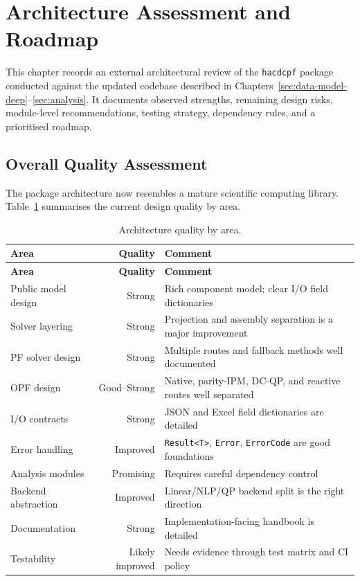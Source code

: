 \section{Architecture Assessment and Roadmap}
\label{sec:arch-assessment}

This chapter records an external architectural review of the
\texttt{hacdcpf} package conducted against the updated codebase described
in Chapters~\ref{sec:data-model-deep}--\ref{sec:analysis}.
It documents observed strengths, remaining design risks, module-level
recommendations, testing strategy, dependency rules, and a prioritised
roadmap.

\subsection{Overall Quality Assessment}
\label{sec:quality-table}

The package architecture now resembles a mature scientific computing library.
Table~\ref{tab:quality} summarises the current design quality by area.

\begin{longtable}{lrl}
\caption{Architecture quality by area.\label{tab:quality}} \\
\hline\hline
\textbf{Area} & \textbf{Quality} & \textbf{Comment} \\
\hline\endfirsthead
\hline\hline
\textbf{Area} & \textbf{Quality} & \textbf{Comment} \\
\hline\endhead
\hline\endfoot
Public model design & Strong & Rich component model; clear I/O field dictionaries \\
Solver layering & Strong & Projection and assembly separation is a major improvement \\
PF solver design & Strong & Multiple routes and fallback methods well documented \\
OPF design & Good--Strong & Native, parity-IPM, DC-QP, and reactive routes well separated \\
I/O contracts & Strong & JSON and Excel field dictionaries are detailed \\
Error handling & Improved & \texttt{Result<T>}, \texttt{Error}, \texttt{ErrorCode} are good foundations \\
Analysis modules & Promising & Requires careful dependency control \\
Backend abstraction & Improved & Linear/NLP/QP backend split is the right direction \\
Documentation & Strong & Implementation-facing handbook is detailed \\
Testability & Likely improved & Needs evidence through test matrix and CI policy \\
\end{longtable}

